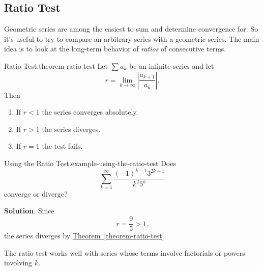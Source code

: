 \documentclass[10pt,]{book}
\numberwithin{equation}{section}
\newcommand{\lt}{<}
\newcommand{\gt}{>}
\begin{document}
\subsection[{Ratio Test}]{Ratio Test}\label{subsection-ratio-test}
\hypertarget{p-913}{}%
Geometric series are among the easiest to sum and determine convergence for. So it's useful to try to compare an arbitrary series with a geometric series. The main idea is to look at the long-term behavior of \emph{ratios} of consecutive terms.%
\begin{theorem}{Ratio Test.}{}{theorem-ratio-test}%
\hypertarget{p-914}{}%
Let \(\sum a_{k}\) be an infinite series and let%
\begin{equation*}
r = \lim_{k\to\infty}\left|\frac{a_{k+1}}{a_{k}}\right|\text{.}
\end{equation*}
Then \leavevmode%
\begin{enumerate}
\item\hypertarget{li-101}{}\hypertarget{p-915}{}%
If \(r \lt 1\) the series converges absolutely.%
\item\hypertarget{li-102}{}\hypertarget{p-916}{}%
If \(r \gt 1\) the series diverges.%
\item\hypertarget{li-103}{}\hypertarget{p-917}{}%
If \(r = 1\) the test fails.%
\end{enumerate}
%
\end{theorem}
\begin{example}{Using the Ratio Test.}{example-using-the-ratio-test}%
\hypertarget{p-918}{}%
Does%
\begin{equation*}
\sum_{k=1}^{\infty}\frac{(-1)^{k-1}3^{2k+1}}{k^{2}5^{k}}
\end{equation*}
converge or diverge?%
\par\smallskip%
\noindent\textbf{Solution}.\hypertarget{solution-188}{}\quad%
\hypertarget{p-919}{}%
Since%
\begin{equation*}
r = \frac{9}{5} \gt 1\text{,}
\end{equation*}
the series diverges by \hyperref[theorem-ratio-test]{Theorem~\ref{theorem-ratio-test}}.%
\end{example}
\hypertarget{p-920}{}%
The ratio test works well with series whose terms involve factorials or powers involving \(k\).%
\end{document}
